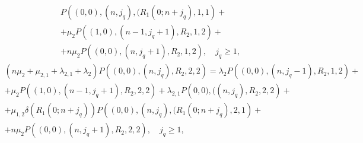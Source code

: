 {\begin{multline}
  P\left((0,0),(n,j_q),(R_1(0;n+j_q),1,1\right)+\\ +
  \mu_2 P\left((1,0),(n-1,j_q+1),R_2,1,2\right)+ \\ + n\mu_2
  P\left((0,0),(n,j_q+1),R_2,1,2\right), \quad j_q\geqslant  1,
\label{eq:7.3}
\end{multline}
\begin{multline}
  \left(n\mu_2+\mu_{2,1}+\lambda_{2,1}+\lambda_2\right)
  P\left((0,0),(n,j_q),R_2,2,2\right) =
  \lambda_2 P\left((0,0),(n,j_q-1),R_2,1,2\right)+ \\ +
  \mu_2  P\left((1,0),(n-1,j_q+1),R_2,2,2\right)+ \lambda_{2,1}
  P\left(0,0),((n,j_q),R_2,2,2\right)+ \\ +
  \mu_{1,2}\delta\left(R_1(0;n+j_q)\right)
  P\left((0,0),(n,j_q),(R_1(0;n+j_q),2,1\right)+\\ +
  n\mu_2 P\left((0,0),(n,j_q+1),R_2,2,2\right), \quad j_q\geqslant  1,
\label{eq:7.4}
\end{multline}

}
